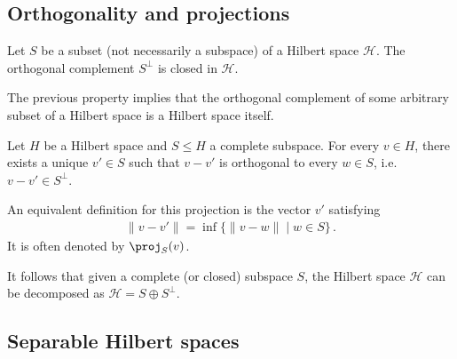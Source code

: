 \subsection{Orthogonality and projections}\label{section:orthogonal_projections}

    \begin{property}
        Let $S$ be a subset (not necessarily a subspace) of a Hilbert space $\mathcal{H}$. The orthogonal complement $S^\perp$ is closed in $\mathcal{H}$.
    \end{property}
    \begin{result}
        The previous property implies that the orthogonal complement of some arbitrary subset of a Hilbert space is a Hilbert space itself.
    \end{result}

    \begin{theorem}\label{functional:projection_theorem}
        Let $H$ be a Hilbert space and $S\leq H$ a complete subspace. For every $v\in H$, there exists a unique $v'\in S$ such that $v-v'$ is orthogonal to every $w\in S$, i.e.~$v-v'\in S^\perp$.
    \end{theorem}
    \begin{remark}
        An equivalent definition for this projection is the vector $v'$ satisfying
        \begin{gather}
            \|v-v'\| = \inf\{\|v-w\|\mid w\in S\}\,.
        \end{gather}
        It is often denoted by $\proj_S(v)$.
    \end{remark}
    \begin{result}
        It follows that given a complete (or closed) subspace $S$, the Hilbert space $\mathcal{H}$ can be decomposed as $\mathcal{H}=S\oplus S^\perp$.
    \end{result}


\subsection{Separable Hilbert spaces}

